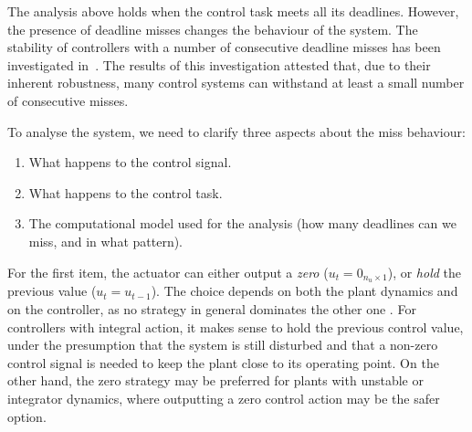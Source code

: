The analysis above holds when the control task meets all its deadlines.
However, the presence of deadline misses changes the behaviour of the system.
The stability of controllers with a number of consecutive deadline misses has been investigated in~\cite{Maggio:2020}.
The results of this investigation attested that, due to their inherent robustness, many control systems can withstand at least a small number of consecutive misses.

To analyse the system, we need to clarify three aspects about the miss behaviour:

\begin{enumerate}[label=(\roman*)]
    \item What happens to the control signal.
    \item What happens to the control task.
    \item The computational model used for the analysis (how many deadlines can we miss, and in what pattern).
\end{enumerate}

For the first item, the actuator can either output a \emph{zero} ($u_t = 0_{n_u \times 1}$), or \emph{hold} the previous value ($u_t = u_{t-1}$).
The choice depends on both the plant dynamics and on the controller, as no strategy in general dominates the other one \cite{schenato09}.
For controllers with integral action, it makes sense to hold the previous control value, under the presumption that the system is still disturbed and that a non-zero control signal is needed to keep the plant close to its operating point.
On the other hand, the zero strategy may be preferred for plants with unstable or integrator dynamics, where outputting a zero control action may be the safer option.

